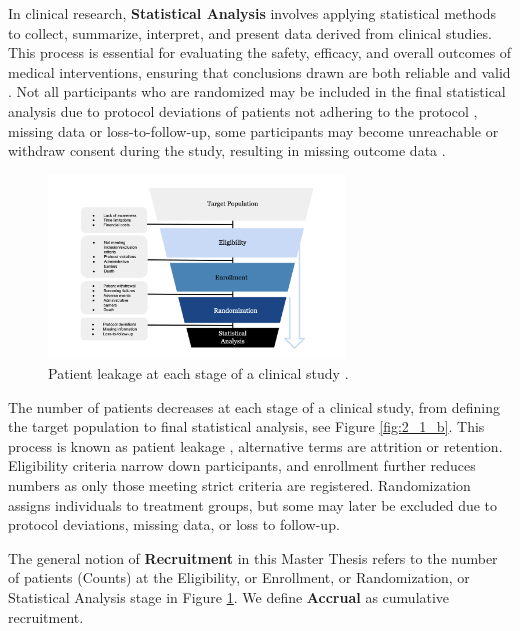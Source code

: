 In clinical research, \textbf{Statistical Analysis} involves applying statistical methods to collect, summarize, interpret, and present data derived from clinical studies. This process is essential for evaluating the safety, efficacy, and overall outcomes of medical interventions, ensuring that conclusions drawn are both reliable and valid \citep{panos2023statistical}. Not all participants who are randomized may be included in the final statistical analysis due to protocol deviations of patients not adhering to the protocol \citep{rehman2020exclusion}, missing data \citep{shih2002problems} or loss-to-follow-up, some participants may become unreachable or withdraw consent during the study, resulting in missing outcome data \citep{nuesch2009effects}.

\begin{figure}[h]
  \centering
  \includegraphics[width=0.7\textwidth]{fig_2_1_a.png}
  \caption{Patient leakage at each stage of a clinical study \citep{piantadosi2022principles, whelan2018high, bogin2022lasagna}.}
  \label{fig:2_1_a}
\end{figure}

The number of patients decreases at each stage of a clinical study, from defining the target population to final statistical analysis, see Figure \ref{fig:2_1_b}. This process is known as patient leakage \citep{desai2014preventing}, alternative terms are attrition or retention. Eligibility criteria narrow down participants, and enrollment further reduces numbers as only those meeting strict criteria are registered. Randomization assigns individuals to treatment groups, but some may later be excluded due to protocol deviations, missing data, or loss to follow-up. 

The general notion of \textbf{Recruitment} in this Master Thesis refers to the number of patients (Counts) at the Eligibility, or Enrollment, or Randomization, or Statistical Analysis stage in Figure \ref{fig:2_1_a}. We define \textbf{Accrual} as cumulative recruitment.

